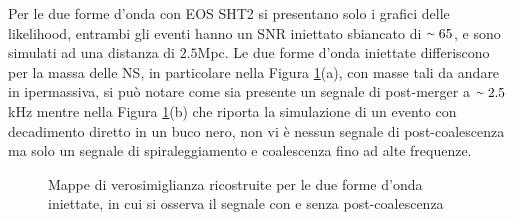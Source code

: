 Per le due forme d'onda con EOS SHT2 si presentano solo i grafici delle likelihood, entrambi gli eventi hanno un SNR iniettato sbiancato di $\smallsim 65$, e sono simulati ad una distanza di $2.5$Mpc. Le due forme d'onda iniettate differiscono per la massa delle NS, in particolare nella Figura \ref{fig:likelihood_sht2}(a), con masse tali da andare in ipermassiva, si può notare come sia presente un segnale di post-merger a $\smallsim 2.5$kHz mentre nella Figura \ref{fig:likelihood_sht2}(b) che riporta la simulazione di un evento con decadimento diretto in un buco nero, non vi è nessun segnale di post-coalescenza ma solo un segnale di spiraleggiamento e coalescenza fino ad alte frequenze. 
\begin{figure}[hbt!]
	\centering
	\caption{Mappe di verosimiglianza ricostruite per le due forme d'onda iniettate, in cui si osserva il segnale con e senza post-coalescenza}
	\label{fig:likelihood_sht2}
	\vspace{-15pt}
\end{figure}

